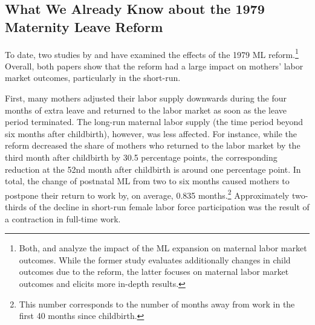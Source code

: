 


\bigskip
\subsection{What We Already Know about the 1979 Maternity Leave Reform} \label{sec_mlch: info_ml_reform}
To date, two studies by \cite{Dustmann2012} and \cite{schonberg2014expansions} have examined the effects of the 1979 ML reform.\footnote{Both, \cite{Dustmann2012} and \cite{schonberg2014expansions} analyze the impact of the ML expansion on maternal labor market outcomes. While the former study evaluates additionally changes in child outcomes due to the reform, the latter focuses on maternal labor market outcomes and elicits more in-depth results.} Overall, both papers show that the reform had a large impact on mothers' labor market outcomes, particularly in the short-run. 


First, many mothers adjusted their labor supply downwards during the four months of extra leave and returned to the labor market as soon as the leave period terminated. The long-run maternal labor supply (the time period beyond six months after childbirth), however, was less affected. For instance, while the reform decreased the share of mothers who returned to the labor market by the third month after childbirth by 30.5 percentage points, the corresponding reduction at the 52nd month after childbirth is around one percentage point. In total, the change of postnatal ML from two to six months caused mothers to postpone their return to work by, on average, 0.835 months.\footnote{This number corresponds to the number of months away from work in the first 40 months since childbirth.} Approximately two-thirds of the decline in short-run female labor force participation was the result of a contraction in full-time work. 



